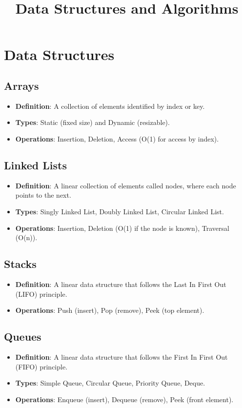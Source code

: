 \documentclass{article}
\title{Data Structures and Algorithms}
\author{}
\date{}
\begin{document}
\maketitle

\section{Data Structures}

\subsection{Arrays}
\begin{itemize}
    \item \textbf{Definition}: A collection of elements identified by index or key.
    \item \textbf{Types}: Static (fixed size) and Dynamic (resizable).
    \item \textbf{Operations}: Insertion, Deletion, Access (O(1) for access by index).
\end{itemize}

\subsection{Linked Lists}
\begin{itemize}
    \item \textbf{Definition}: A linear collection of elements called nodes, where each node points to the next.
    \item \textbf{Types}: Singly Linked List, Doubly Linked List, Circular Linked List.
    \item \textbf{Operations}: Insertion, Deletion (O(1) if the node is known), Traversal (O(n)).
\end{itemize}

\subsection{Stacks}
\begin{itemize}
    \item \textbf{Definition}: A linear data structure that follows the Last In First Out (LIFO) principle.
    \item \textbf{Operations}: Push (insert), Pop (remove), Peek (top element).
\end{itemize}

\subsection{Queues}
\begin{itemize}
    \item \textbf{Definition}: A linear data structure that follows the First In First Out (FIFO) principle.
    \item \textbf{Types}: Simple Queue, Circular Queue, Priority Queue, Deque.
    \item \textbf{Operations}: Enqueue (insert), Dequeue (remove), Peek (front element).
\end{itemize}
\end{document}
